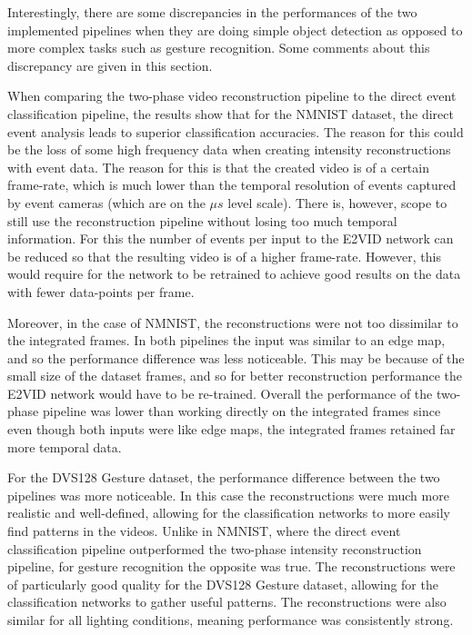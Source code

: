 Interestingly, there are some discrepancies in the performances of the two implemented pipelines when they are doing simple object detection as opposed to more complex tasks such as gesture recognition. Some comments about this discrepancy are given in this section.

When comparing the two-phase video reconstruction pipeline to the direct event classification pipeline, the results show that for the NMNIST dataset, the direct event analysis leads to superior classification accuracies. The reason for this could be the loss of some high frequency data when creating intensity reconstructions with event data. The reason for this is that the created video is of a certain frame-rate, which is much lower than the temporal resolution of events captured by event cameras (which are on the $ \mu s $ level scale). There is, however, scope to still use the reconstruction pipeline without losing too much temporal information. For this the number of events per input to the E2VID network can be reduced so that the resulting video is of a higher frame-rate. However, this would require for the network to be retrained to achieve good results on the data with fewer data-points per frame.

Moreover, in the case of NMNIST, the reconstructions were not too dissimilar to the integrated frames. In both pipelines the input was similar to an edge map, and so the performance difference was less noticeable. This may be because of the small size of the dataset frames, and so for better reconstruction performance the E2VID network would have to be re-trained. Overall the performance of the two-phase pipeline was lower than working directly on the integrated frames since even though both inputs were like edge maps, the integrated frames retained far more temporal data.

For the DVS128 Gesture dataset, the performance difference between the two pipelines was more noticeable. In this case the reconstructions were much more realistic and well-defined, allowing for the classification networks to more easily find patterns in the videos. Unlike in NMNIST, where the direct event classification pipeline outperformed the two-phase intensity reconstruction pipeline, for gesture recognition the opposite was true. The reconstructions were of particularly good quality for the DVS128 Gesture dataset, allowing for the classification networks to gather useful patterns. The reconstructions were also similar for all lighting conditions, meaning performance was consistently strong. 

